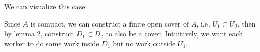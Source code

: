 \documentclass{article}
\numberwithin{equation}{section}
\begin{document}
We can visualize this case: 
\begin{center}
\end{center}
Since $A$ is compact, we can construct a finite open cover of $A$, i.e. $U_1 \subset U_2$, then by lemma 2, construct $D_1 \subset D_2$ to also be a cover. Intuitively, we want each worker to do some work inside $D_1$ but no work outside $U_1.$
\end{document}
